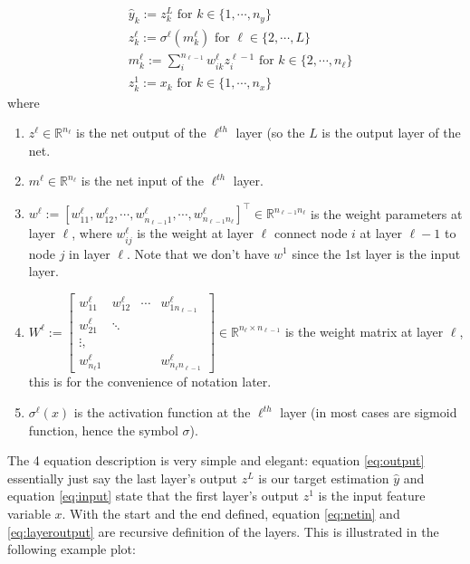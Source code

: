 \documentclass{article} [10pt] %
\begin{document}
\begin{align}
	&\hat{y}_k := z^L_k \text{ for } k \in \{1, \cdots, n_y\} \label{eq:output} \\
	&z^\ell_k := \sigma^\ell (m^\ell_k) \text{ for } \ell \in \{2, \cdots, L\} \label{eq:layeroutput} \\
	&m^\ell_k := \sum^{n_{\ell-1}}_i w^\ell_{ik}z^{\ell-1}_i \text{ for } k \in \{2, \cdots, n_{\ell}\} \label{eq:netin}\\ 
	&z^1_k := x_k \text{ for } k \in \{1, \cdots, n_x\} \label{eq:input}
\end{align}
where
\begin{enumerate}
	\item $z^\ell \in \mathbb{R}^{n_\ell}$ is the net output of the $\ell^{th}$ layer (so the $L$ is the output layer of the net.
	\item $m^\ell \in \mathbb{R}^{n_\ell}$ is the net input of the $\ell^{th}$ layer.
	\item $w^\ell := [w^\ell_{11}, w^\ell_{12}, \cdots,w^\ell_{n_{\ell-1}1}, \cdots,w^\ell_{n_{\ell-1}n_\ell}]^\top \in \mathbb{R}^{n_{\ell-1}n_\ell}$ is the weight parameters at layer $\ell$, where $w^\ell_{ij}$ is the weight at layer $\ell$ connect node $i$ at layer $\ell-1$ to node $j$ in layer $\ell$. Note that we don't have $w^1$ since the 1st layer is the input layer.
	\item $W^\ell := \begin{bmatrix}
				w_{11}^\ell &w_{12}^\ell &\cdots &w_{1n_{\ell-1}}^\ell\\
				w^\ell_{21} &\ddots \\
				\vdots,\\
				w^\ell_{n_{\ell}1} &&&w^\ell_{n_{\ell}n_{\ell-1}}
				\end{bmatrix} \in \mathbb{R}^{n_\ell \times n_{\ell-1}}$ is the weight matrix at layer $\ell$, this is for the convenience of notation later.
	\item $\sigma^\ell(x)$ is the activation function at the $\ell^{th}$ layer (in most cases are sigmoid function, hence the symbol $\sigma$).
\end{enumerate}

The 4 equation description is very simple and elegant: equation \eqref{eq:output} essentially just say the last layer's output $z^L$ is our target estimation $\hat{y}$ and equation \eqref{eq:input} state that the first layer's output $z^1$ is the input feature variable $x$. With the start and the end defined, equation \eqref{eq:netin} and \eqref{eq:layeroutput} are recursive definition of the layers. This is illustrated in the following example plot:
\end{document}
